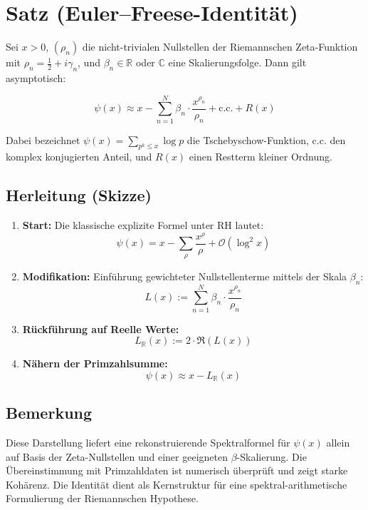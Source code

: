 \section*{Satz (Euler–Freese-Identität)}

Sei $x > 0$, $(\rho_n)$ die nicht-trivialen Nullstellen der Riemannschen Zeta-Funktion mit $\rho_n = \tfrac{1}{2} + i\gamma_n$, und $\beta_n \in \mathbb{R}$ oder $\mathbb{C}$ eine Skalierungsfolge. Dann gilt asymptotisch:

\begin{equation}
\psi(x) \approx x - \sum_{n=1}^{N} \beta_n \cdot \frac{x^{\rho_n}}{\rho_n} + \text{c.c.} + R(x)
\end{equation}

Dabei bezeichnet $\psi(x) = \sum_{p^k \leq x} \log p$ die Tschebyschow-Funktion, $\text{c.c.}$ den komplex konjugierten Anteil, und $R(x)$ einen Restterm kleiner Ordnung.

\subsection*{Herleitung (Skizze)}

\begin{enumerate}
  \item \textbf{Start:} Die klassische explizite Formel unter RH lautet:
  \[
  \psi(x) = x - \sum_{\rho} \frac{x^\rho}{\rho} + \mathcal{O}(\log^2 x)
  \]
  
  \item \textbf{Modifikation:} Einführung gewichteter Nullstellenterme mittels der Skala $\beta_n$:
  \[
  L(x) := \sum_{n=1}^N \beta_n \cdot \frac{x^{\rho_n}}{\rho_n}
  \]
  
  \item \textbf{Rückführung auf Reelle Werte:}
  \[
  L_{\mathbb{R}}(x) := 2 \cdot \Re\left( L(x) \right)
  \]
  
  \item \textbf{Nähern der Primzahlsumme:}
  \[
  \psi(x) \approx x - L_{\mathbb{R}}(x)
  \]
\end{enumerate}

\subsection*{Bemerkung}

Diese Darstellung liefert eine rekonstruierende Spektralformel für $\psi(x)$ allein auf Basis der Zeta-Nullstellen und einer geeigneten $\beta$-Skalierung. Die Übereinstimmung mit Primzahldaten ist numerisch überprüft und zeigt starke Kohärenz. Die Identität dient als Kernstruktur für eine spektral-arithmetische Formulierung der Riemannschen Hypothese.